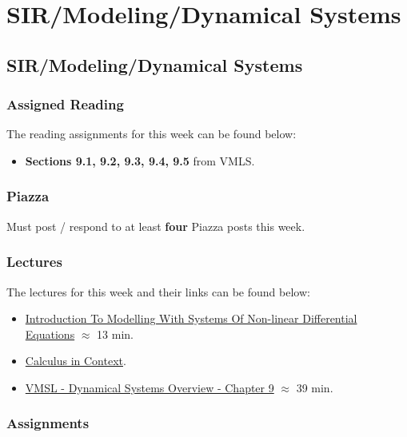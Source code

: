 \clearpage

\renewcommand{\ChapTitle}{SIR/Modeling/Dynamical Systems}
\renewcommand{\SectionTitle}{SIR/Modeling/Dynamical Systems}

\chapter{\ChapTitle}
\section{\SectionTitle}

\subsection{Assigned Reading}

The reading assignments for this week can be found below:

\begin{itemize}
    \item \textbf{Sections 9.1, 9.2, 9.3, 9.4, 9.5} from VMLS.
\end{itemize}

\subsection{Piazza}

Must post / respond to at least \textbf{four} Piazza posts this week.  

\subsection{Lectures}

The lectures for this week and their links can be found below:

\begin{itemize}
    \item \href{https://applied.cs.colorado.edu/mod/hvp/view.php?id=50773}{Introduction To Modelling With Systems Of Non-linear Differential Equations} $\approx$ 13 min.
    \item \href{https://scholarworks.smith.edu/textbooks/2/}{Calculus in Context}.
    \item \href{https://www.youtube.com/watch?v=NS0jvPLtgGc}{VMSL - Dynamical Systems Overview - Chapter 9} $\approx$ 39 min.
\end{itemize}

\subsection{Assignments}

